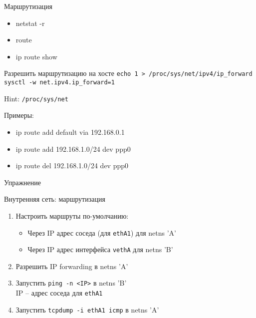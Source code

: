 \begin{frame}{Маршрутизация}
	\begin{itemize}
		\item netstat -r
		\item route
		\item ip route show
	\end{itemize}

	\begin{block}{Разрешить маршрутизацию на хосте}
		{\tt echo 1 > /proc/sys/net/ipv4/ip\_forward}\\
		{\tt sysctl -w net.ipv4.ip\_forward=1}
	\end{block}
	
	Hint: {\tt /proc/sys/net}

	Примеры:
	\begin{itemize}
		\item ip route add default via 192.168.0.1
		\item ip route add 192.168.1.0/24 dev ppp0
		\item ip route del 192.168.1.0/24 dev ppp0
	\end{itemize}

\end{frame}


\begin{frame}[fragile]{Упражнение}
    \begin{block}{Внутренняя сеть: маршрутизация}
        \begin{enumerate}
            \item Настроить маршруты по-умолчанию:
                \begin{itemize}
                    \item Через IP адрес соседа (для {\tt ethA1}) для netns 'A'
                    \item Через IP адрес интерфейса {\tt vethA} для netns 'B'
                \end{itemize}
            \item Разрешить IP forwarding в netns 'A'
            \item Запустить {\tt ping -n <IP>} в netns 'B'\\
                IP -- адрес соседа для {\tt ethA1}
            \item Запустить {\tt tcpdump -i ethA1 icmp} в netns 'A'
        \end{enumerate}
    \end{block}
\end{frame}
